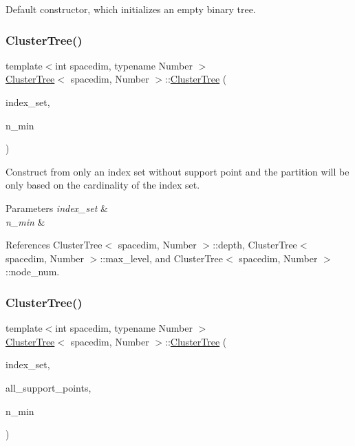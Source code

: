 Default constructor, which initializes an empty binary tree. \mbox{\label{classClusterTree_ae21fda96c7d405825a853f8759c0cc4c}} 
\subsubsection{\texorpdfstring{Cluster\+Tree()}{ClusterTree()}\hspace{0.1cm}{\footnotesize\ttfamily [2/5]}}
{\footnotesize\ttfamily template$<$int spacedim, typename Number $>$ \\
\hyperlink{classClusterTree}{Cluster\+Tree}$<$ spacedim, Number $>$\+::\hyperlink{classClusterTree}{Cluster\+Tree} (\begin{DoxyParamCaption}\item[{const std\+::vector$<$ types\+::global\+\_\+dof\+\_\+index $>$ \&}]{index\+\_\+set,  }\item[{const unsigned int}]{n\+\_\+min }\end{DoxyParamCaption})}

Construct from only an index set without support point and the partition will be only based on the cardinality of the index set. 
\begin{DoxyParams}{Parameters}
{\em index\+\_\+set} & \\
\hline
{\em n\+\_\+min} & \\
\hline
\end{DoxyParams}


References Cluster\+Tree$<$ spacedim, Number $>$\+::depth, Cluster\+Tree$<$ spacedim, Number $>$\+::max\+\_\+level, and Cluster\+Tree$<$ spacedim, Number $>$\+::node\+\_\+num.

\mbox{\label{classClusterTree_a587c465f14f7fa0e0e6a82aa8733452f}} 
\subsubsection{\texorpdfstring{Cluster\+Tree()}{ClusterTree()}\hspace{0.1cm}{\footnotesize\ttfamily [3/5]}}
{\footnotesize\ttfamily template$<$int spacedim, typename Number $>$ \\
\hyperlink{classClusterTree}{Cluster\+Tree}$<$ spacedim, Number $>$\+::\hyperlink{classClusterTree}{Cluster\+Tree} (\begin{DoxyParamCaption}\item[{const std\+::vector$<$ types\+::global\+\_\+dof\+\_\+index $>$ \&}]{index\+\_\+set,  }\item[{const std\+::vector$<$ Point$<$ spacedim $>$$>$ \&}]{all\+\_\+support\+\_\+points,  }\item[{const unsigned int}]{n\+\_\+min }\end{DoxyParamCaption})}

